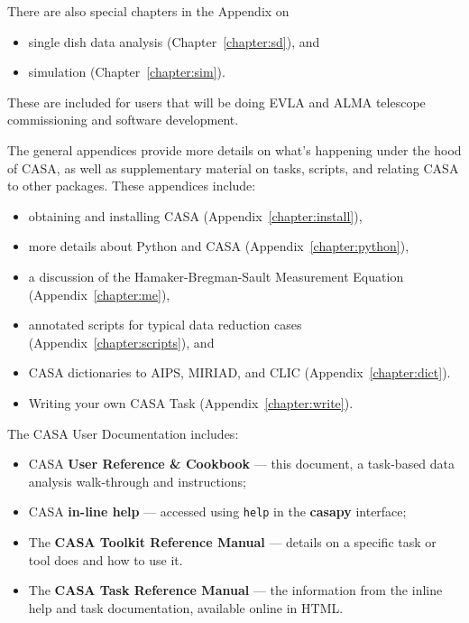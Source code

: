 There are also special chapters in the Appendix on
\begin{itemize}
   \item single dish data analysis (Chapter~\ref{chapter:sd}), and

   \item simulation (Chapter~\ref{chapter:sim}).

\end{itemize}
These are included for users that will be doing EVLA and ALMA
telescope commissioning and software development.

The general appendices provide more details on what's happening
under the hood of CASA, as well as supplementary material on tasks,
scripts, and relating CASA to other packages.  These appendices
include:
\begin{itemize}
   \item obtaining and installing CASA 
         (Appendix~\ref{chapter:install}),

   \item more details about Python and CASA 
         (Appendix~\ref{chapter:python}),

   \item a discussion of the Hamaker-Bregman-Sault Measurement Equation
         (Appendix~\ref{chapter:me}),


   \item annotated scripts for typical data reduction cases 
         (Appendix~\ref{chapter:scripts}), and

   \item CASA dictionaries to AIPS, MIRIAD, and CLIC
         (Appendix~\ref{chapter:dict}).

   \item Writing your own CASA Task
         (Appendix~\ref{chapter:write}).
\end{itemize}

The CASA User Documentation includes:
\begin{itemize}
   \item CASA {\bf User Reference \& Cookbook} --- this
     document, a task-based data analysis walk-through and instructions;
   \item CASA {\bf in-line help} --- accessed using {\tt help} in the 
              {\bf casapy} interface;
   \item The {\bf CASA Toolkit Reference Manual} --- 
         details on a specific task or tool does and how to use it.
   \item The {\bf CASA Task Reference Manual} --- 
         the information from the inline help and task documentation,
         available online in HTML.
\end{itemize}


